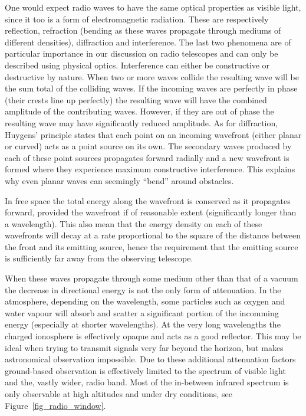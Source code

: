 One would expect radio waves to have the same optical properties as visible light, since it too is a form of electromagnetic radiation. These are respectively reflection, refraction (bending as these waves propagate
through mediums of different densities), diffraction and interference. The last two phenomena are of particular importance in our discussion on radio telescopes and can only be described using
physical optics. Interference can either be constructive or destructive by nature. When two or more waves collide the resulting wave will be the sum total of the colliding waves. If the incoming waves are perfectly 
in phase (their crests line up perfectly) the resulting wave will have the combined amplitude of the contributing waves. However, if they are out of phase the resulting wave may have significantly reduced amplitude. 
As for diffraction, Huygens' principle states that each point on an incoming wavefront (either planar or curved) acts as a point source on its own. The secondary waves produced by each of these point sources 
propagates forward radially and a new wavefront is formed where they experience maximum constructive interference. This explains why even planar waves can seemingly ``bend'' around obstacles.

In free space the total energy along the wavefront is conserved as it propagates forward, provided 
the wavefront if of reasonable extent (significantly longer than a wavelength). This also mean that the energy density 
on each of these wavefronts will decay at a rate proportional to the square of the distance between the front and its emitting source, hence
the requirement that the emitting source is sufficiently far away from the observing telescope. 

When these waves propagate through some medium other than that of a vacuum the decrease in directional energy is not the only form of attenuation. In the 
atmosphere, depending on the wavelength, some particles such as oxygen and water vapour will absorb and scatter a significant portion of the incomming 
energy (especially at shorter wavelengths). At the very long wavelengths the charged ionosphere is effectively opaque and acts as a good reflector. This may 
be ideal when trying to transmit signals very far beyond the horizon, but makes astronomical observation impossible.  Due to these additional attenuation 
factors ground-based observation is effectively limited to the spectrum of visible light and the, vastly wider, radio band. Most of the in-between 
infrared spectrum is only observable at high altitudes and under dry conditions, see Figure~\ref{fig_radio_window}. 

